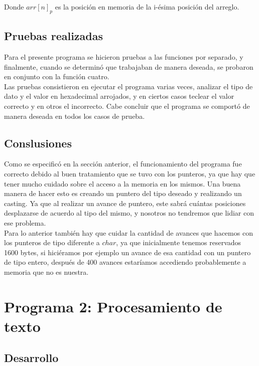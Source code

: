 \documentclass[12pt]{article}
\begin{document}
Donde $arr[n]_p$ es la posición en memoria de la i-ésima posición del arreglo.\\

\subsection{Pruebas realizadas}
Para el presente programa se hicieron pruebas a las funciones por separado, y finalmente, cuando se determinó que trabajaban de manera deseada, se probaron en conjunto con la función cuatro.\\

Las pruebas consistieron en ejecutar el programa varias veces, analizar el tipo de dato y el valor en hexadecimal arrojados, y en ciertos casos teclear el valor correcto y en otros el incorrecto. Cabe concluir que el programa se comportó de manera deseada en todos los casos de prueba.

\subsection{Conslusiones}

Como se especificó en la sección anterior, el funcionamiento del programa fue correcto debido al buen tratamiento que se tuvo con los punteros, ya que hay que tener mucho cuidado sobre el acceso a la memoria en los mismos. Una buena manera de hacer esto es creando un puntero del tipo deseado y realizando un casting. Ya que al realizar un avance de puntero, este sabrá cuántas posiciones desplazarse de acuerdo al tipo del mismo, y nosotros no tendremos que lidiar con ese problema.\\

Para lo anterior también hay que cuidar la cantidad de avances que hacemos con los punteros de tipo diferente a $char$, ya que inicialmente tenemos reservados 1600 bytes, si hiciéramos por ejemplo un avance de esa cantidad con un puntero de tipo entero, después de 400 avances estaríamos accediendo probablemente a memoria que no es nuestra.

\section{Programa 2: Procesamiento de texto}

\subsection{Desarrollo}
\end{document}
